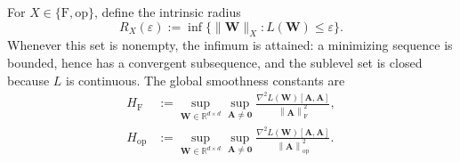 \documentclass[11pt]{article}
\theoremstyle{definition}
\newcommand{\Ab}{\mathbf{A}}
\newcommand{\Gb}{\mathbf{G}}
\newcommand{\Sb}{\mathbf{S}}
\newcommand{\Ub}{\mathbf{U}}
\newcommand{\Vb}{\mathbf{V}}
\newcommand{\Wb}{\mathbf{W}}
\newcommand{\RR}{\mathbb{R}}
\newcommand{\eps}{\varepsilon}
\newcommand{\normF}[1]{\left\lVert #1\right\rVert_{\mathrm F}}
\newcommand{\normop}[1]{\left\lVert #1\right\rVert_{\mathrm{op}}}
\newcommand{\HF}{H_{\mathrm F}}
\newcommand{\Hop}{H_{\mathrm{op}}}
\DeclareMathOperator{\polar}{polar}
\begin{document}
For $X\in\{\mathrm F,\mathrm{op}\}$, define the intrinsic radius
\[
 R_X(\eps)
 :=
 \inf\bigl\{\|\Wb\|_X:L(\Wb)\leq\eps\bigr\}.
\]
Whenever this set is nonempty, the infimum is attained: a minimizing
sequence is bounded, hence has a convergent subsequence, and the sublevel
set is closed because $L$ is continuous.  The global smoothness constants
are
\begin{align*}
 \HF
 &:={}
 \sup_{\Wb\in\RR^{d\times d}}
 \sup_{\Ab\ne\mathbf 0}
 \frac{\nabla^2L(\Wb)[\Ab,\Ab]}{\normF{\Ab}^2},\\
 \Hop
 &:={}
 \sup_{\Wb\in\RR^{d\times d}}
 \sup_{\Ab\ne\mathbf 0}
 \frac{\nabla^2L(\Wb)[\Ab,\Ab]}{\normop{\Ab}^2}.
\end{align*}

\end{document}
